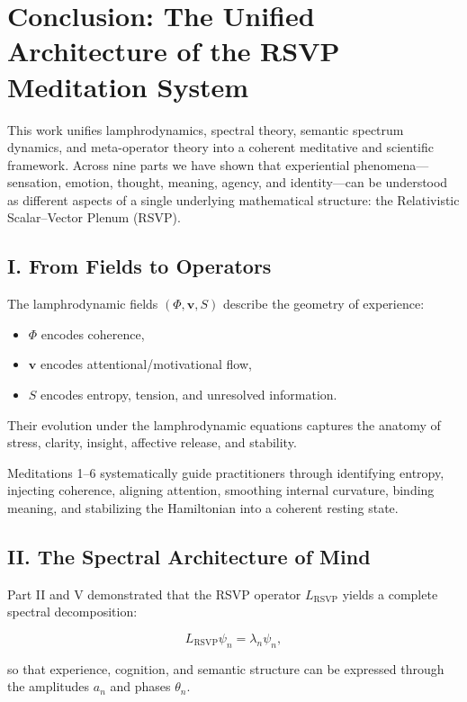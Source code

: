 \documentclass[12pt]{article}
\begin{document}
\chapter*{Conclusion: The Unified Architecture of the RSVP Meditation System}

This work unifies lamphrodynamics, spectral theory, semantic spectrum dynamics,
and meta-operator theory into a coherent meditative and scientific framework.
Across nine parts we have shown that experiential phenomena—sensation, emotion,
thought, meaning, agency, and identity—can be understood as different aspects of
a single underlying mathematical structure: the Relativistic Scalar–Vector
Plenum (RSVP).

\section*{I. From Fields to Operators}

The lamphrodynamic fields $(\Phi, \mathbf{v}, S)$ describe the geometry of
experience:

\begin{itemize}
    \item $\Phi$ encodes coherence,
    \item $\mathbf{v}$ encodes attentional/motivational flow,
    \item $S$ encodes entropy, tension, and unresolved information.
\end{itemize}

Their evolution under the lamphrodynamic equations captures the anatomy of
stress, clarity, insight, affective release, and stability.  

Meditations 1–6 systematically guide practitioners through identifying entropy,
injecting coherence, aligning attention, smoothing internal curvature, binding
meaning, and stabilizing the Hamiltonian into a coherent resting state.

\section*{II. The Spectral Architecture of Mind}

Part II and V demonstrated that the RSVP operator $L_{\text{RSVP}}$ yields a
complete spectral decomposition:

\[
L_{\text{RSVP}} \psi_n = \lambda_n \psi_n,
\]

so that experience, cognition, and semantic structure can be expressed through
the amplitudes $a_n$ and phases $\theta_n$.
\end{document}

